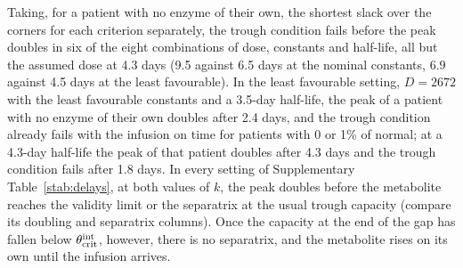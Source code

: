 Taking, for a patient with no enzyme of their own, the shortest slack over the corners for each
criterion separately, the trough condition fails before the peak doubles in six of the eight
combinations of dose, constants and half-life, all but the assumed dose at 4.3 days (9.5 against 6.5
days at the nominal constants, 6.9 against 4.5 days at the least favourable). In the least favourable
setting, $D=2672$ with the least favourable constants and a 3.5-day half-life, the peak of a patient
with no enzyme of their own doubles after 2.4 days, and the trough condition already fails with the
infusion on time for patients with 0 or 1\% of normal; at a 4.3-day half-life the peak of that
patient doubles after 4.3 days and the trough condition fails after 1.8 days. In every setting of
Supplementary Table~\ref{stab:delays}, at both values of $k$, the peak doubles before the metabolite
reaches the validity limit or the separatrix at the usual trough capacity (compare its doubling and
separatrix columns). Once the capacity at the end of the gap has fallen below
$\theta_{\mathrm{crit}}^{\mathrm{int}}$, however, there is no separatrix, and the metabolite rises on its own until the infusion
arrives.

